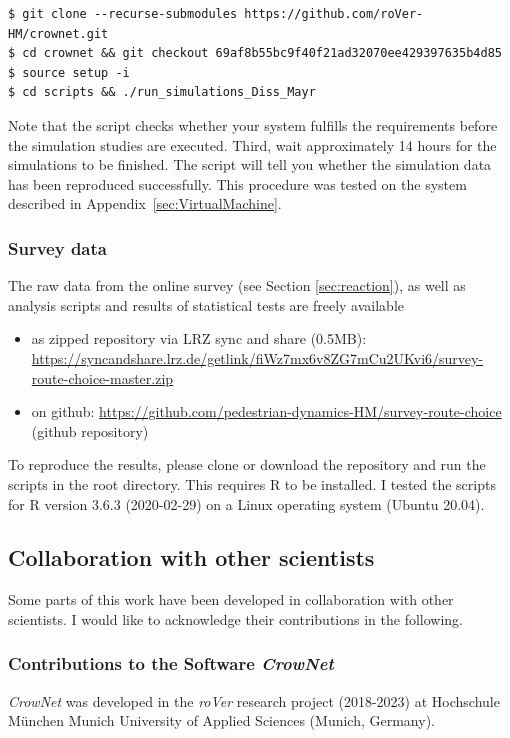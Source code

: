 \begin{lstlisting}[]
$ git clone --recurse-submodules https://github.com/roVer-HM/crownet.git
$ cd crownet && git checkout 69af8b55bc9f40f21ad32070ee429397635b4d85
$ source setup -i 
$ cd scripts && ./run_simulations_Diss_Mayr
\end{lstlisting}
Note that the script checks whether your system fulfills the requirements before the simulation studies are executed. 
Third, wait approximately 14 hours for the simulations to be finished. The script will tell you whether the simulation data has been reproduced successfully.
This procedure was tested on the system described in Appendix~\ref{sec:VirtualMachine}. 


\subsubsection*{Survey data}
\label{sec:surveydata}
The raw data from the online survey (see Section \ref{sec:reaction}), as well as analysis scripts and results of statistical tests are freely available
\begin{itemize}
\item {as zipped repository via LRZ sync and share (0.5MB)}:  \url{https://syncandshare.lrz.de/getlink/fiWz7mx6v8ZG7mCu2UKvi6/survey-route-choice-master.zip}
\item {on github}: \url{https://github.com/pedestrian-dynamics-HM/survey-route-choice} (github repository)
\end{itemize} 

To reproduce the results, please clone or download the repository and run the scripts in the root directory. This requires R to be installed. I tested the scripts for R version 3.6.3 (2020-02-29) on a Linux operating system (Ubuntu 20.04).


\subsection*{Collaboration with other scientists}
\label{sec:collaboration}
Some parts of this work have been developed in collaboration with other scientists. I would like to acknowledge their contributions in the following.

\subsubsection{Contributions to the Software \textit{CrowNet}}


\textit{CrowNet} was developed in the \textit{roVer} research project (2018-2023) at Hochschule München Munich University of Applied Sciences (Munich, Germany). 

